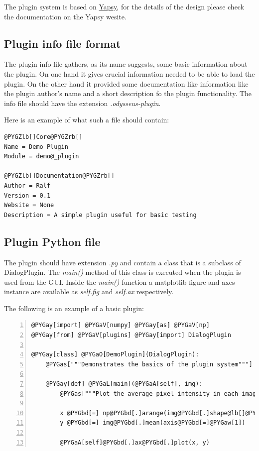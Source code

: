 \documentclass[letterpaper,10pt,english]{manual}
\begin{document}
The plugin system is based on \href{http://yapsy.sourceforge.net/}{Yapsy}, for the
details of the design please check the documentation on the Yapsy wesite.


\subsection{Plugin info file format}

The plugin info file gathers, as its name suggests, some basic
information about the plugin. On one hand it gives crucial information
needed to be able to load the plugin. On the other hand it provided
some documentation like information like the plugin author's name and
a short description fo the plugin functionality. The info file
should have the extension \emph{.odysseus-plugin}.

Here is an example of what such a file should contain:

\begin{Verbatim}[commandchars=@\[\]]
@PYGZlb[]Core@PYGZrb[]
Name = Demo Plugin
Module = demo@_plugin

@PYGZlb[]Documentation@PYGZrb[]
Author = Ralf
Version = 0.1
Website = None
Description = A simple plugin useful for basic testing
\end{Verbatim}


\subsection{Plugin Python file}

The plugin should have extension \emph{.py} and contain a class that
is a subclass of DialogPlugin. The
\emph{main()} method of this class is executed when the plugin is used from the
GUI. Inside the \emph{main()} function a matplotlib figure and axes instance are
available as \emph{self.fig} and \emph{self.ax} respectively.

The following is an example of a basic plugin:

\begin{Verbatim}[commandchars=@\[\],numbers=left,firstnumber=1,stepnumber=1]
@PYGay[import] @PYGaV[numpy] @PYGay[as] @PYGaV[np]
@PYGay[from] @PYGaV[plugins] @PYGay[import] DialogPlugin

@PYGay[class] @PYGaO[DemoPlugin](DialogPlugin):
    @PYGas["""Demonstrates the basics of the plugin system"""]

    @PYGay[def] @PYGaL[main](@PYGaA[self], img):
        @PYGas["""Plot the average pixel intensity in each image row"""]

        x @PYGbd[=] np@PYGbd[.]arange(img@PYGbd[.]shape@lb[]@PYGaw[0]@rb[])
        y @PYGbd[=] img@PYGbd[.]mean(axis@PYGbd[=]@PYGaw[1])

        @PYGaA[self]@PYGbd[.]ax@PYGbd[.]plot(x, y)
\end{Verbatim}
\end{document}
